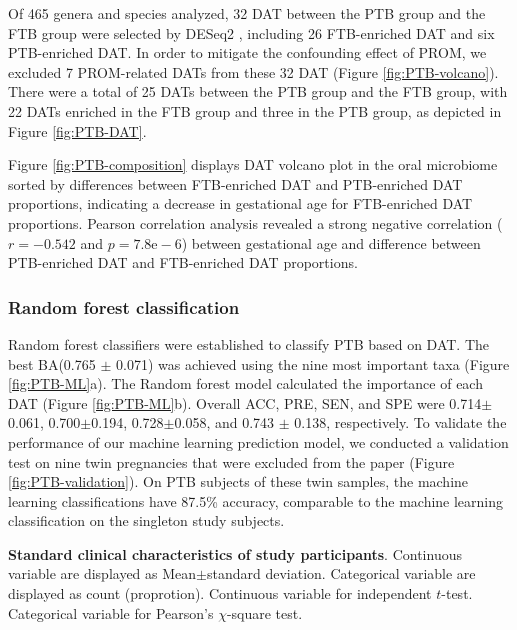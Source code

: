 \documentclass[11pt, a4paper, onecolumn, oneside]{report}
\begin{document}
                Of 465 genera and species analyzed, 32 DAT between the PTB group and the FTB group were selected by DESeq2 \cite{DESeq2-1}, including 26 FTB-enriched DAT and six PTB-enriched DAT. In order to mitigate the confounding effect of PROM, we excluded 7 PROM-related DATs from these 32 DAT (Figure \ref{fig:PTB-volcano}). There were a total of 25 DATs between the PTB group and the FTB group, with 22 DATs enriched in the FTB group and three in the PTB group, as depicted in Figure \ref{fig:PTB-DAT}.

                Figure \ref{fig:PTB-composition} displays DAT volcano plot in the oral microbiome sorted by differences between FTB-enriched DAT and PTB-enriched DAT proportions, indicating a decrease in gestational age for FTB-enriched DAT proportions. Pearson correlation analysis revealed a strong negative correlation ($r = -0.542$ and $p = 7.8\textrm{e}-6$) between gestational age and difference between PTB-enriched DAT and FTB-enriched DAT proportions.

            \subsubsection{Random forest classification}
                Random forest classifiers were established to classify PTB based on DAT. The best BA(0.765 $\pm$ 0.071) was achieved using the nine most important taxa (Figure \ref{fig:PTB-ML}a). The Random forest model calculated the importance of each DAT (Figure \ref{fig:PTB-ML}b). Overall ACC, PRE, SEN, and SPE were 0.714$\pm$0.061, 0.700$\pm$0.194, 0.728$\pm$0.058, and 0.743 $\pm$ 0.138, respectively. To validate the performance of our machine learning prediction model, we conducted a validation test on nine twin pregnancies that were excluded from the paper (Figure \ref{fig:PTB-validation}). On PTB subjects of these twin samples, the machine learning classifications have 87.5\% accuracy, comparable to the machine learning classification on the singleton study subjects.

            \begin{table}[p]
                \centering

                \caption[Standard clinical characteristics of study participants]{\textbf{Standard clinical characteristics of study participants}. Continuous variable are displayed as Mean$\pm$standard deviation. Categorical variable are displayed as count (proprotion). Continuous variable for independent $t$-test. Categorical variable for Pearson’s $\chi$-square test.}
                \label{tab:PTB-clinical}
            \end{table}
            \clearpage
\end{document}
